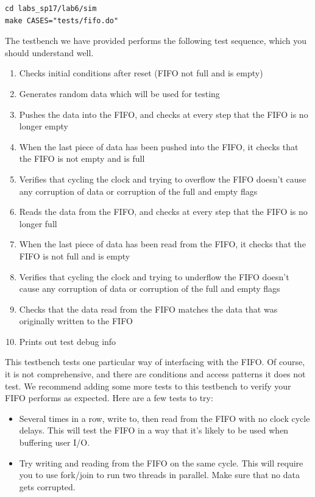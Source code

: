 \documentclass[11pt]{article}
\begin{document}
\begin{verbatim}
cd labs_sp17/lab6/sim
make CASES="tests/fifo.do"
\end{verbatim}

The testbench we have provided performs the following test sequence, which you should understand well.
\begin{enumerate}
	\item Checks initial conditions after reset (FIFO not full and is empty)
	\item Generates random data which will be used for testing
	\item Pushes the data into the FIFO, and checks at every step that the FIFO is no longer empty
	\item When the last piece of data has been pushed into the FIFO, it checks that the FIFO is not empty and is full
	\item Verifies that cycling the clock and trying to overflow the FIFO doesn't cause any corruption of data or corruption of the full and empty flags
	\item Reads the data from the FIFO, and checks at every step that the FIFO is no longer full
	\item When the last piece of data has been read from the FIFO, it checks that the FIFO is not full and is empty
	\item Verifies that cycling the clock and trying to underflow the FIFO doesn't cause any corruption of data or corruption of the full and empty flags
	\item Checks that the data read from the FIFO matches the data that was originally written to the FIFO
	\item Prints out test debug info
\end{enumerate}

This testbench tests one particular way of interfacing with the FIFO. Of course, it is not comprehensive, and there are conditions and access patterns it does not test. We recommend adding some more tests to this testbench to verify your FIFO performs as expected. Here are a few tests to try:

\begin{itemize}
	\item Several times in a row, write to, then read from the FIFO with no clock cycle delays. This will test the FIFO in a way that it's likely to be used when buffering user I/O.
	\item Try writing and reading from the FIFO on the same cycle. This will require you to use fork/join to run two threads in parallel. Make sure that no data gets corrupted.
\end{itemize}
\end{document}
